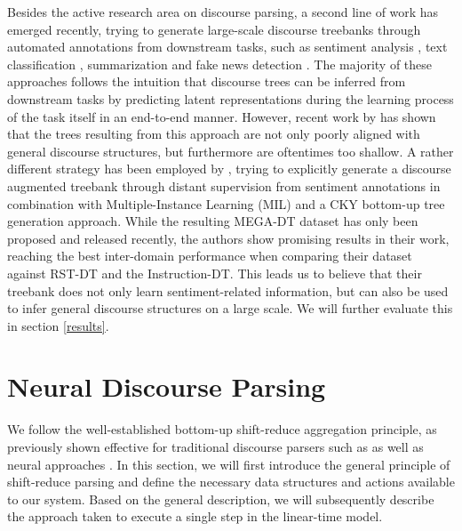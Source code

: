 \documentclass[11pt]{article}
\begin{document}
Besides the active research area on discourse parsing, a second line of work has emerged recently, trying to generate large-scale discourse treebanks through automated annotations from downstream tasks, such as sentiment analysis \cite{huber2020MEGA}, text classification \cite{liu-lapata-2018-learning}, summarization \cite{liu2019single} and fake news detection \cite{karimi2019learning}. The majority of these approaches follows the intuition that discourse trees can be inferred from downstream tasks by predicting latent representations during the learning process of the task itself \cite{liu-lapata-2018-learning,karimi2019learning,liu2019single} in an end-to-end manner. However, recent work by  has shown that the trees resulting  from this approach are not only poorly aligned with general discourse structures, but furthermore are oftentimes too shallow. A rather different strategy has been employed by , trying to explicitly generate a discourse augmented treebank through distant supervision from sentiment annotations in combination with Multiple-Instance Learning (MIL) and a CKY bottom-up tree generation approach. While the resulting MEGA-DT dataset has only been proposed and released recently, the authors show promising results in their work, reaching the best inter-domain performance when comparing their dataset against RST-DT and the Instruction-DT. This leads us to believe that their treebank does not only learn sentiment-related information, but can also be used to infer general discourse structures on a large scale. We will further evaluate this in section \ref{results}. 



\section{Neural Discourse Parsing}
We follow the well-established bottom-up shift-reduce aggregation principle, as previously shown effective for traditional discourse parsers such as \cite{ji2014representation,wang-etal-2017-two} as well as neural approaches \cite{braud-etal-2017-cross-lingual,yu2018transition}. In this section, we will first introduce the general principle of shift-reduce parsing and define the necessary data structures and actions available to our system. Based on the general description, we will subsequently describe the approach taken to execute a single step in the linear-time model. 
\end{document}
